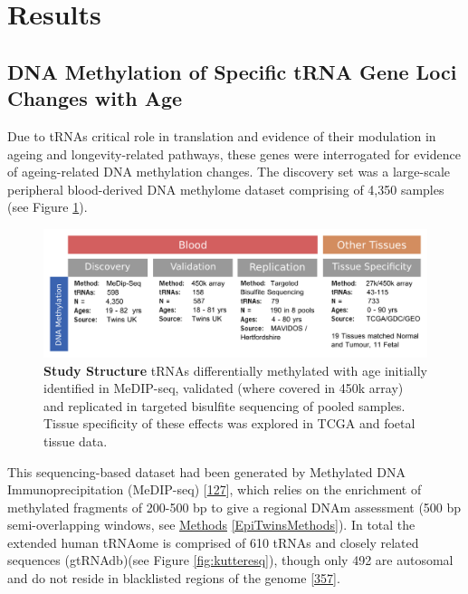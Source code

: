 \documentclass[
]{book}
\begin{document}
\newpage

\hypertarget{res}{%
\section{Results}\label{res}}

\hypertarget{dna-methylation-of-specific-trna-gene-loci-changes-with-age}{%
\subsection{DNA Methylation of Specific tRNA Gene Loci Changes with Age}\label{dna-methylation-of-specific-trna-gene-loci-changes-with-age}}

Due to tRNAs critical role in translation and evidence of their modulation in ageing and longevity-related pathways, these genes were interrogated for evidence of ageing-related DNA methylation changes.
The discovery set was a large-scale peripheral blood-derived DNA methylome dataset comprising of 4,350 samples (see Figure \ref{fig:OverviewOfAnalyses}).

\begin{figure}

{\centering \includegraphics[width=1\linewidth]{figs/OverviewOfAnalysesFigure_tRNA_3} 

}

\caption{\textbf{Study Structure} tRNAs differentially methylated with age initially identified in MeDIP-seq, validated (where covered in 450k array) and replicated in targeted bisulfite sequencing of pooled samples. Tissue specificity of these effects was explored in TCGA and foetal tissue data.}\label{fig:OverviewOfAnalyses}
\end{figure}



This sequencing-based dataset had been generated by Methylated DNA Immunoprecipitation (MeDIP-seq) {[}\protect\hyperlink{ref-Down2009}{127}{]}, which relies on the enrichment of methylated fragments of 200-500 bp to give a regional DNAm assessment (500 bp semi-overlapping windows, see \protect\hyperlink{EpiTwinsMethods}{Methods} \ref{EpiTwinsMethods}).
In total the extended human tRNAome is comprised of 610 tRNAs and closely related sequences (gtRNAdb)(see Figure \ref{fig:kutteresq}), though only 492 are autosomal and do not reside in blacklisted regions of the genome {[}\protect\hyperlink{ref-Amemiya2019}{357}{]}.
\end{document}
